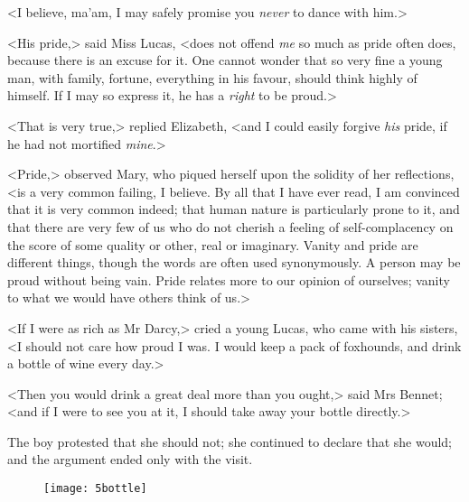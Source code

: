 <I believe, ma'am, I may safely promise you \textit{never} to dance with him.>

<His pride,> said Miss Lucas, <does not offend \textit{me} so much as pride often does, because there is an excuse for it. One cannot wonder that so very fine a young man, with family, fortune, everything in his favour, should think highly of himself. If I may so express it, he has a \textit{right} to be proud.>

<That is very true,> replied Elizabeth, <and I could easily forgive \textit{his} pride, if he had not mortified \textit{mine}.>

<Pride,> observed Mary, who piqued herself upon the solidity of her reflections, <is a very common failing, I believe. By all that I have ever read, I am convinced that it is very common indeed; that human nature is particularly prone to it, and that there are very few of us who do not cherish a feeling of self-complacency on the score of some quality or other, real or imaginary. Vanity and pride are different things, though the words are often used synonymously. A person may be proud without being vain. Pride relates more to our opinion of ourselves; vanity to what we would have others think of us.>

<If I were as rich as Mr Darcy,> cried a young Lucas, who came with his sisters, <I should not care how proud I was. I would keep a pack of foxhounds, and drink a bottle of wine every day.>

<Then you would drink a great deal more than you ought,> said Mrs Bennet; <and if I were to see you at it, I should take away your bottle directly.>

The boy protested that she should not; she continued to declare that she would; and the argument ended only with the visit.

\begin{figure}[b!]
\centering
\texttt{[image: 5bottle]}
\end{figure}